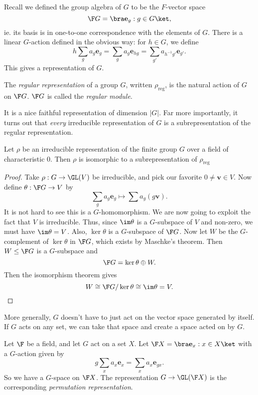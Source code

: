 \documentclass[a4paper]{article}
\begin{document}
Recall we defined the group algebra of $G$ to be the $F$-vector space
\[
  \F G = \bra \mathbf{e}_g: g \in G\ket,
\]
ie. its basis is in one-to-one correspondence with the elements of $G$. There is a linear $G$-action defined in the obvious way: for $h \in G$, we define
\[
  h \sum_g a_g \mathbf{e}_g = \sum_g a_g \mathbf{e}_{hg} = \sum_{g'} a_{h^{-1}g'} \mathbf{e}_{g'}.
\]
This gives a representation of $G$.
\begin{defi}
  The \emph{regular representation} of a group $G$, written $\rho_{\mathrm{reg}}$, is the natural action of $G$ on $\F G$. $\F G$ is called the \emph{regular module}.
\end{defi}
It is a nice faithful representation of dimension $|G|$. Far more importantly, it turns out that \emph{every} irreducible representation of $G$ is a subrepresentation of the regular representation.
\begin{prop}
  Let $\rho$ be an irreducible representation of the finite group $G$ over a field of characteristic 0. Then $\rho$ is isomorphic to a subrepresentation of $\rho_{\mathrm{reg}}$
\end{prop}

\begin{proof}
  Take $\rho: G \to \GL(V)$ be irreducible, and pick our favorite $0 \not= \mathbf{v} \in V$. Now define $\theta: \F G \to V$ by
  \[
    \sum_g a_g \mathbf{e}_g \mapsto \sum a_g (g\mathbf{v}).
  \]
  It is not hard to see this is a $G$-homomorphism. We are now going to exploit the fact that $V$ is irreducible. Thus, since $\im \theta$ is a $G$-subspace of $V$ and non-zero, we must have $\im \theta = V$. Also, $\ker \theta$ is a $G$-subspace of $\F G$. Now let $W$ be the $G$-complement of $\ker \theta$ in $\F G$, which exists by Maschke's theorem. Then $W \leq \F G$ is a $G$-subspace and
  \[
    \F G = \ker \theta \oplus W.
  \]
  Then the isomorphism theorem gives
  \[
    W\cong \F G / \ker \theta \cong \im \theta = V.
  \]
\end{proof}
More generally, $G$ doesn't have to just act on the vector space generated by itself. If $G$ acts on any set, we can take that space and create a space acted on by $G$.
\begin{defi}
  Let $\F$ be a field, and let $G$ act on a set $X$. Let $\F X = \bra \mathbf{e}_x: x \in X\ket$ with a $G$-action given by
  \[
    g \sum_x a_x \mathbf{e}_x = \sum_x a_x \mathbf{e}_{gx}.
  \]
  So we have a $G$-space on $\F X$. The representation $G \to \GL(\F X)$ is the corresponding \emph{permutation representation}.
\end{defi}
\end{document}
